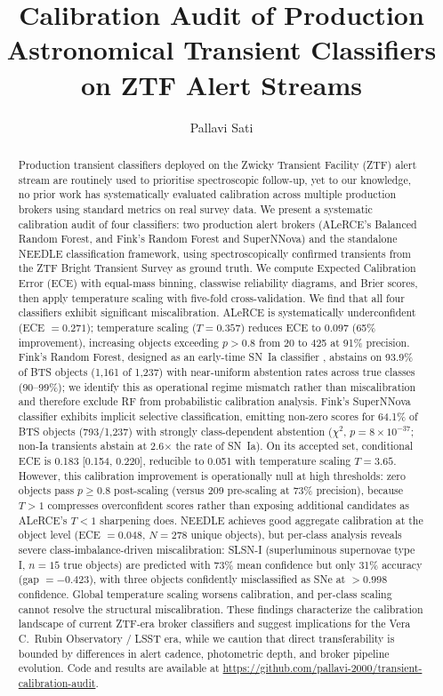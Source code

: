 \documentclass[twocolumn]{aastex631}
\begin{document}
\title{Calibration Audit of Production Astronomical Transient Classifiers on ZTF Alert Streams}

\author{Pallavi Sati}

\begin{abstract}
Production transient classifiers deployed on the Zwicky Transient Facility (ZTF) alert stream are routinely used to prioritise spectroscopic follow-up, yet to our knowledge, no prior work has systematically evaluated calibration across multiple production brokers using standard metrics on real survey data. We present a systematic calibration audit of four classifiers: two production alert brokers (ALeRCE's Balanced Random Forest, and Fink's Random Forest and SuperNNova) and the standalone NEEDLE classification framework, using spectroscopically confirmed transients from the ZTF Bright Transient Survey as ground truth. We compute Expected Calibration Error (ECE) with equal-mass binning, classwise reliability diagrams, and Brier scores, then apply temperature scaling with five-fold cross-validation. We find that all four classifiers exhibit significant miscalibration. ALeRCE is systematically underconfident (ECE $= 0.271$); temperature scaling ($T = 0.357$) reduces ECE to $0.097$ (65\% improvement), increasing objects exceeding $p > 0.8$ from 20 to 425 at 91\% precision. Fink's Random Forest, designed as an early-time SN~Ia classifier \citep{leoni2022}, abstains on 93.9\% of BTS objects (1,161 of 1,237) with near-uniform abstention rates across true classes (90--99\%); we identify this as operational regime mismatch rather than miscalibration and therefore exclude RF from probabilistic calibration analysis. Fink's SuperNNova classifier exhibits implicit selective classification, emitting non-zero scores for 64.1\% of BTS objects (793/1,237) with strongly class-dependent abstention ($\chi^2$, $p = 8 \times 10^{-37}$; non-Ia transients abstain at 2.6$\times$ the rate of SN~Ia). On its accepted set, conditional ECE is 0.183 [0.154, 0.220], reducible to 0.051 with temperature scaling $T = 3.65$. However, this calibration improvement is operationally null at high thresholds: zero objects pass $p \ge 0.8$ post-scaling (versus 209 pre-scaling at 73\% precision), because $T > 1$ compresses overconfident scores rather than exposing additional candidates as ALeRCE's $T < 1$ sharpening does. NEEDLE achieves good aggregate calibration at the object level (ECE $= 0.048$, $N = 278$ unique objects), but per-class analysis reveals severe class-imbalance-driven miscalibration: SLSN-I (superluminous supernovae type I, $n = 15$ true objects) are predicted with 73\% mean confidence but only 31\% accuracy (gap $= -0.423$), with three objects confidently misclassified as SNe at $> 0.998$ confidence. Global temperature scaling worsens calibration, and per-class scaling cannot resolve the structural miscalibration. These findings characterize the calibration landscape of current ZTF-era broker classifiers and suggest implications for the Vera C.\ Rubin Observatory / LSST era, while we caution that direct transferability is bounded by differences in alert cadence, photometric depth, and broker pipeline evolution. Code and results are available at \url{https://github.com/pallavi-2000/transient-calibration-audit}.

\end{abstract}
\end{document}
